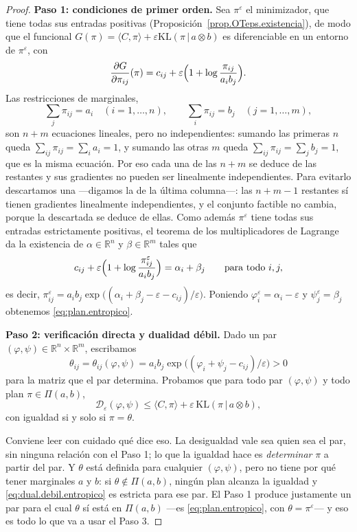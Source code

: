\documentclass[12pt, a4paper]{amsbook}
\newcommand{\R}{{\mathbb R}}
\theoremstyle{remark}
\theoremstyle{definition}
\numberwithin{section}{chapter}
\numberwithin{subsection}{section}
\numberwithin{equation}{section}
\numberwithin{figure}{chapter}
\begin{document}
\begin{proof}
\textbf{Paso 1: condiciones de primer orden.}
Sea $\pi^\varepsilon$ el minimizador, que tiene todas sus entradas positivas
(Proposición~\ref{prop.OTeps.existencia}), de modo que el funcional
$G(\pi)=\langle C,\pi\rangle+\varepsilon\mathrm{KL}(\pi\,|\,a\otimes b)$ es
diferenciable en un entorno de $\pi^\varepsilon$, con
\[
\frac{\partial G}{\partial\pi_{ij}}(\pi)=c_{ij}+\varepsilon\Bigl(1+\log\frac{\pi_{ij}}{a_ib_j}\Bigr).
\]
Las restricciones de marginales,
\[
\sum_j\pi_{ij}=a_i\quad(i=1,\dots,n),
\qquad
\sum_i\pi_{ij}=b_j\quad(j=1,\dots,m),
\]
son $n+m$ ecuaciones lineales, pero no independientes: sumando las primeras
$n$ queda $\sum_{ij}\pi_{ij}=\sum_ia_i=1$, y sumando las otras $m$ queda
$\sum_{ij}\pi_{ij}=\sum_jb_j=1$, que es la misma ecuación. Por eso cada una
de las $n+m$ se deduce de las restantes y sus gradientes no pueden ser
linealmente independientes. Para evitarlo descartamos una —digamos la de la
última columna—: las $n+m-1$ restantes sí tienen gradientes linealmente
independientes, y el conjunto factible no cambia, porque la descartada se
deduce de ellas. Como además $\pi^\varepsilon$ tiene todas sus entradas
estrictamente positivas, el
teorema de los multiplicadores de Lagrange da la existencia de $\alpha\in\R^n$ y $\beta\in\R^m$ tales
que
\[
c_{ij}+\varepsilon\Bigl(1+\log\frac{\pi^\varepsilon_{ij}}{a_ib_j}\Bigr)=\alpha_i+\beta_j
\qquad\text{para todo }i,j,
\]
es decir,
$\pi^\varepsilon_{ij}=a_ib_j\exp\bigl((\alpha_i+\beta_j-\varepsilon-c_{ij})/\varepsilon\bigr)$.
Poniendo $\varphi^\varepsilon_i=\alpha_i-\varepsilon$ y $\psi^\varepsilon_j=\beta_j$
obtenemos \eqref{eq:plan.entropico}.

\medskip
\textbf{Paso 2: verificación directa y dualidad débil.}
Dado un par $(\varphi,\psi)\in\R^n\times\R^m$, escribamos
\begin{equation}\label{eq:theta.par}
\theta_{ij}=\theta_{ij}(\varphi,\psi)=a_ib_j\exp\bigl((\varphi_i+\psi_j-c_{ij})/\varepsilon\bigr)>0
\end{equation}
para la matriz que el par determina. Probamos que para todo par
$(\varphi,\psi)$ y todo plan $\pi\in\Pi(a,b)$,
\begin{equation}\label{eq:dual.debil.entropico}
\mathcal D_\varepsilon(\varphi,\psi)\le\langle C,\pi\rangle+\varepsilon\,\mathrm{KL}(\pi\,|\,a\otimes b),
\end{equation}
con igualdad si y solo si $\pi=\theta$.

Conviene leer con cuidado qué dice eso. La desigualdad vale sea quien sea el
par, sin ninguna relación con el Paso 1; lo que la igualdad hace es
\emph{determinar} $\pi$ a partir del par. Y $\theta$ está definida para
cualquier $(\varphi,\psi)$, pero no tiene por qué tener marginales $a$ y $b$:
si $\theta\notin\Pi(a,b)$, ningún plan alcanza la igualdad y
\eqref{eq:dual.debil.entropico} es estricta para ese par. El Paso 1 produce
justamente un par para el cual $\theta$ sí está en $\Pi(a,b)$ —es
\eqref{eq:plan.entropico}, con $\theta=\pi^\varepsilon$— y eso es todo lo que
va a usar el Paso 3.


\end{proof}
\end{document}
